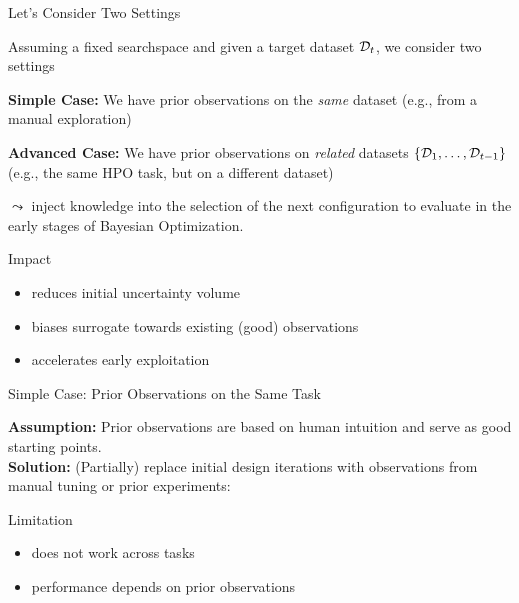 \documentclass[main]{subfiles}
\begin{document}
\begin{frame}[c]{Let's Consider Two Settings}

Assuming a fixed searchspace and given a target dataset $\mathcal{D}_t$, we consider two settings

\textbf{Simple Case:} We have prior observations on the \textit{same} dataset (e.g., from a manual exploration)

\textbf{Advanced Case:} We have prior observations on \textit{related} datasets $\{\mathcal{D}_1, \dots, \mathcal{D}_{t-1}\}$ (e.g., the same HPO task, but on a different dataset)

\vspace{0.5cm}
$\leadsto$ inject knowledge into the selection of the next configuration to evaluate in the early stages of Bayesian Optimization.

%
%
\begin{block}{\raggedright Impact}
  \begin{itemize}
    \item reduces initial uncertainty volume
    \item biases surrogate towards existing (good) observations
    \item accelerates early exploitation
  \end{itemize}
\end{block}

\end{frame}
\begin{frame}{Simple Case: Prior Observations on the Same Task}

\textbf{Assumption:} Prior observations are based on human intuition and serve as good starting points. \\
\textbf{Solution:} (Partially) replace initial design iterations with observations from manual tuning or prior experiments:

{%
%
%
\begin{block}{\raggedright Limitation}
  \begin{itemize}
    \item does not work across tasks
    \item performance depends on prior observations
  \end{itemize}
\end{block}
}%

\end{frame}
\end{document}
